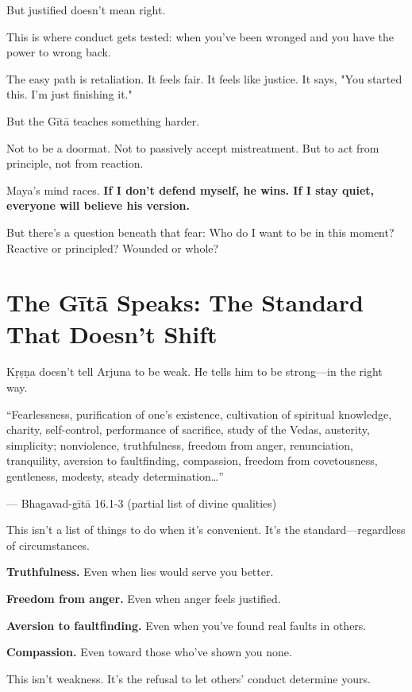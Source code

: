 \documentclass[11pt,twoside]{book}
\begin{document}
But justified doesn't mean right.

This is where conduct gets tested: when you've been wronged and you have the power to wrong back.

The easy path is retaliation. It feels fair. It feels like justice. It says, "You started this. I'm just finishing it."

But the Gītā teaches something harder.

Not to be a doormat. Not to passively accept mistreatment. But to act from principle, not from reaction.

Maya's mind races. \textbf{If I don't defend myself, he wins. If I stay quiet, everyone will believe his version.}

But there's a question beneath that fear: Who do I want to be in this moment? Reactive or principled? Wounded or whole?

\section*{The Gītā Speaks: The Standard That Doesn't Shift}

Kṛṣṇa doesn't tell Arjuna to be weak. He tells him to be strong—in the right way.

\begin{pullquote}
``Fearlessness, purification of one's existence, cultivation of spiritual knowledge, charity, self-control, performance of sacrifice, study of the Vedas, austerity, simplicity; nonviolence, truthfulness, freedom from anger, renunciation, tranquility, aversion to faultfinding, compassion, freedom from covetousness, gentleness, modesty, steady determination…''

--- Bhagavad-gītā 16.1-3 (partial list of divine qualities)
\end{pullquote}

This isn't a list of things to do when it's convenient. It's the standard—regardless of circumstances.

\textbf{\textbf{Truthfulness.}} Even when lies would serve you better.

\textbf{\textbf{Freedom from anger.}} Even when anger feels justified.

\textbf{\textbf{Aversion to faultfinding.}} Even when you've found real faults in others.

\textbf{\textbf{Compassion.}} Even toward those who've shown you none.

This isn't weakness. It's the refusal to let others' conduct determine yours.
\end{document}
